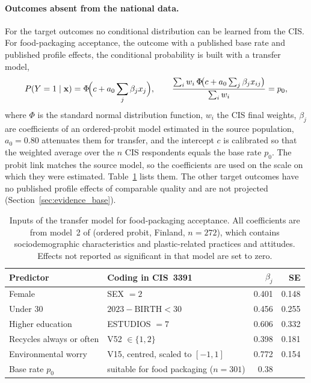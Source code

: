 \paragraph{Outcomes absent from the national data.}
For the target outcomes no conditional distribution can be learned from the
CIS. For food-packaging acceptance, the outcome with a published base rate and
published profile effects, the conditional probability is built with a
transfer model,
\begin{equation}
P(Y = 1 \mid \mathbf{x}) = \Phi\!\Bigl(c + a_0 \sum_j \beta_j x_j\Bigr),
\qquad
\frac{\sum_{i} w_i\, \Phi\!\bigl(c + a_0 \sum_j \beta_j x_{ij}\bigr)}{\sum_i w_i} = p_0 ,
\label{eq:transfer}
\end{equation}
where $\Phi$ is the standard normal distribution function, $w_i$ the CIS
final weights, $\beta_j$ are
coefficients of an ordered-probit model estimated in the source population,
$a_0 = 0.80$ attenuates them for transfer, and the intercept $c$ is calibrated
so that the weighted average over the $n$ CIS respondents equals the base rate
$p_0$.
The probit link matches the source model, so the coefficients are used on the
scale on which they were estimated. Table~\ref{tab:coefficients} lists them.
The other target outcomes have no published profile effects of comparable
quality and are not projected (Section~\ref{sec:evidence_base}).

\begin{table}[htbp]
\centering
\caption{Inputs of the transfer model for food-packaging acceptance. All
coefficients are from model~2 of \citet{ruokamo2022} (ordered probit,
Finland, $n = 272$), which contains sociodemographic characteristics and
plastic-related practices and attitudes. Effects not reported as significant
in that model are set to zero.}
\label{tab:coefficients}
\small
\begin{tabular}{llrr}
\toprule
\textbf{Predictor} & \textbf{Coding in CIS~3391} & $\beta_j$ & \textbf{SE} \\
\midrule
Female & SEX $= 2$ & 0.401 & 0.148 \\
Under 30 & $2023 - \text{BIRTH} < 30$ & 0.456 & 0.255 \\
Higher education & ESTUDIOS $= 7$ & 0.606 & 0.332 \\
Recycles always or often & V52 $\in \{1, 2\}$ & 0.398 & 0.181 \\
Environmental worry & V15, centred, scaled to $[-1, 1]$ & 0.772 & 0.154 \\
\midrule
Base rate $p_0$ & suitable for food packaging ($n = 301$) & 0.38 & \\
\bottomrule
\end{tabular}
\end{table}

